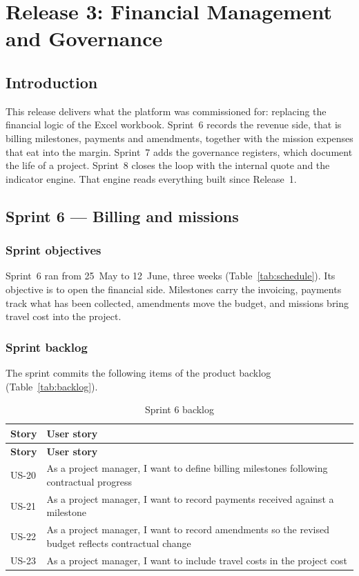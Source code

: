 \chapter{Release 3: Financial Management and Governance}

\section*{Introduction}
This release delivers what the platform was commissioned for: replacing the financial logic of the
Excel workbook. Sprint~6 records the revenue side, that is billing milestones, payments and
amendments, together with the mission expenses that eat into the margin. Sprint~7 adds the
governance registers, which document the life of a project. Sprint~8 closes the loop with the
internal quote and the indicator engine. That engine reads everything built since Release~1.
\section{Sprint 6 --- Billing and missions}

\subsection{Sprint objectives}
Sprint~6 ran from 25~May to 12~June, three weeks (Table~\ref{tab:schedule}). Its objective is to
open the financial side. Milestones carry the invoicing, payments track what has been collected,
amendments move the budget, and missions bring travel cost into the project.

\subsection{Sprint backlog}
The sprint commits the following items of the product backlog (Table~\ref{tab:backlog}).

\begin{longtable}{|m{1.6cm}|m{12.4cm}|}
\caption{Sprint 6 backlog}\label{tab:sb6}\\
\hline
\textbf{Story} & \textbf{User story} \\
\hline
\endfirsthead
\hline
\textbf{Story} & \textbf{User story} \\
\hline
\endhead
\endfoot
\endlastfoot
\hline
US-20 & As a project manager, I want to define billing milestones following contractual progress \\
\hline
US-21 & As a project manager, I want to record payments received against a milestone \\
\hline
US-22 & As a project manager, I want to record amendments so the revised budget reflects contractual change \\
\hline
US-23 & As a project manager, I want to include travel costs in the project cost \\
\hline
\end{longtable}

